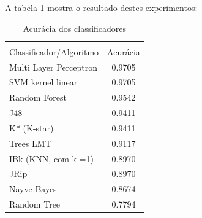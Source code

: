 A tabela \ref{tab:acuracias} mostra o resultado destes experimentos:
\begin{table}[h!]
	\centering
	\caption{Acurácia dos classificadores}
	\label{tab:acuracias}
	\vspace{0.3cm}
	\begin{tabular}{p{6cm}c}
		\hline\\
		Classificador/Algoritmo& Acurácia  \\[10pt] 
		\hline
		Multi Layer Perceptron & 0.9705    \\
		SVM kernel linear~     & 0.9705    \\
		Random Forest~		   & 0.9542	   \\
		J48                    & 0.9411    \\
		K* (K-star)            & 0.9411    \\
		Trees LMT              & 0.9117    \\
		IBk (KNN, com k =1)~   & 0.8970    \\
		JRip                   & 0.8970    \\		
		Nayve Bayes            & 0.8674    \\
		Random Tree            & 0.7794    \\
		\hline
	\end{tabular}
	\\[6pt]		
\end{table}

